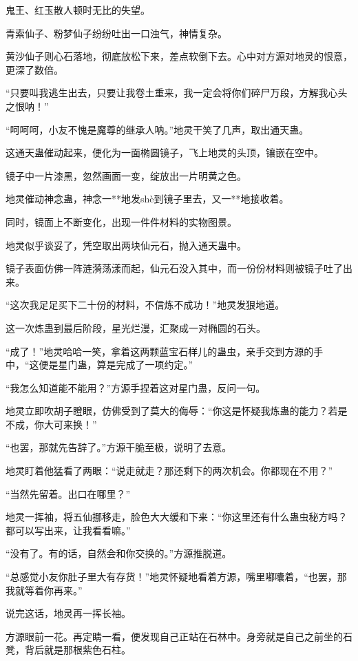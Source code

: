 
\begin{this_body}

鬼王、红玉散人顿时无比的失望。

青索仙子、粉梦仙子纷纷吐出一口浊气，神情复杂。

黄沙仙子则心石落地，彻底放松下来，差点软倒下去。心中对方源对地灵的恨意，更深了数倍。

“只要叫我逃生出去，只要让我卷土重来，我一定会将你们碎尸万段，方解我心头之恨呐！”

“呵呵呵，小友不愧是魔尊的继承人呐。”地灵干笑了几声，取出通天蛊。

这通天蛊催动起来，便化为一面椭圆镜子，飞上地灵的头顶，镶嵌在空中。

镜子中一片漆黑，忽然画面一变，绽放出一片明黄之色。

地灵催动神念蛊，神念一**地发shè到镜子里去，又一**地接收着。

同时，镜面上不断变化，出现一件件材料的实物图景。

地灵似乎谈妥了，凭空取出两块仙元石，抛入通天蛊中。

镜子表面仿佛一阵涟漪荡漾而起，仙元石没入其中，而一份份材料则被镜子吐了出来。

“这次我足足买下二十份的材料，不信炼不成功！”地灵发狠地道。

这一次炼蛊到最后阶段，星光烂漫，汇聚成一对椭圆的石头。

“成了！”地灵哈哈一笑，拿着这两颗蓝宝石样儿的蛊虫，亲手交到方源的手中，“这便是星门蛊，算是完成了一项约定。”

“我怎么知道能不能用？”方源手捏着这对星门蛊，反问一句。

地灵立即吹胡子瞪眼，仿佛受到了莫大的侮辱：“你这是怀疑我炼蛊的能力？若是不成，你大可来换！”

“也罢，那就先告辞了。”方源干脆至极，说明了去意。

地灵盯着他猛看了两眼：“说走就走？那还剩下的两次机会。你都现在不用？”

“当然先留着。出口在哪里？”

地灵一挥袖，将五仙挪移走，脸色大大缓和下来：“你这里还有什么蛊虫秘方吗？都可以写出来，让我看看嘛。”

“没有了。有的话，自然会和你交换的。”方源推脱道。

“总感觉小友你肚子里大有存货！”地灵怀疑地看着方源，嘴里嘟囔着，“也罢，那我就等着你再来。”

说完这话，地灵再一挥长袖。

方源眼前一花。再定睛一看，便发现自己正站在石林中。身旁就是自己之前坐的石凳，背后就是那根紫色石柱。


\end{this_body}
